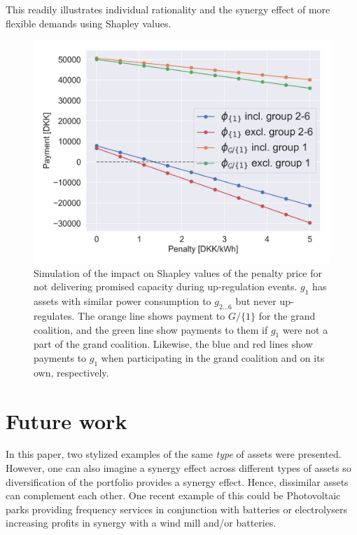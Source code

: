 \documentclass[lettersize,journal]{IEEEtran}
\begin{document}
This readily illustrates individual rationality and the synergy effect of more flexible demands using Shapley values.


\begin{figure}[!t]
    \centering
    \includegraphics[width=\columnwidth]{figures/shapley_values.png}
    \caption{Simulation of the impact on Shapley values of the penalty price for not delivering promised capacity during up-regulation events. $g_1$ has assets with similar power consumption to $g_{2\hdots 6}$ but never up-regulates. The orange line shows payment to $G / \{1\}$ for the grand coalition, and the green line show payments to them if $g_1$ were not a part of the grand coalition. Likewise, the blue and red lines show payments to $g_1$ when participating in the grand coalition and on its own, respectively.}
    \label{fig:shapley_values}
\end{figure}

\section{Future work}

In this paper, two stylized examples of the same \textit{type} of assets were presented. However, one can also imagine a synergy effect across different types of assets so diversification of the portfolio provides a synergy effect. Hence, dissimilar assets can complement each other. One recent example of this could be Photovoltaic parks providing frequency services in conjunction with batteries or electrolysers increasing profits in synergy with a wind mill and/or batteries.
\end{document}
